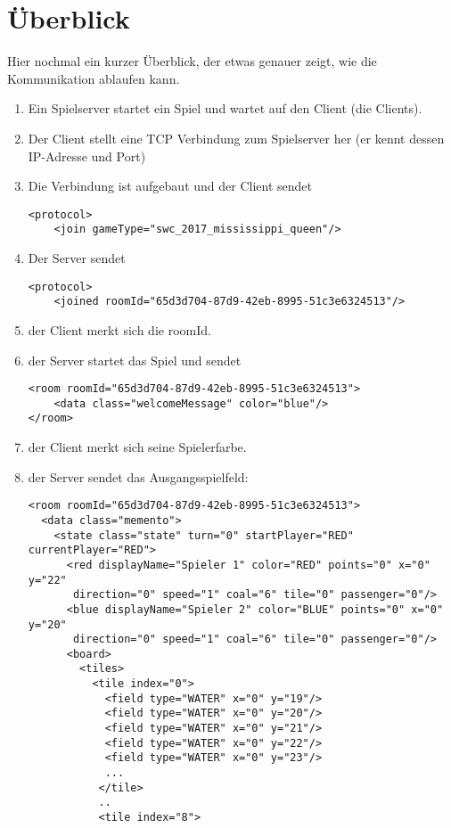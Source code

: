 \documentclass[12pt,a4paper, ngerman, oneside]{scrartcl}
\begin{document}
\newpage
\part{Überblick}
Hier nochmal ein kurzer Überblick, der etwas genauer zeigt, wie die
Kommunikation ablaufen kann.\bigskip\\

\begin{enumerate}
\item Ein Spielserver startet ein Spiel und wartet auf den Client (die Clients).
\item Der Client stellt eine TCP Verbindung zum Spielserver her (er kennt dessen IP-Adresse und Port)
\item Die Verbindung ist aufgebaut und der Client sendet \begin{verbatim}
<protocol>
    <join gameType="swc_2017_mississippi_queen"/>
\end{verbatim}
\item Der Server sendet \begin{verbatim}
<protocol>
    <joined roomId="65d3d704-87d9-42eb-8995-51c3e6324513"/>
\end{verbatim}
\item der Client merkt sich die roomId.
\item der Server startet das Spiel und sendet \begin{verbatim}
<room roomId="65d3d704-87d9-42eb-8995-51c3e6324513">
    <data class="welcomeMessage" color="blue"/>
</room>
\end{verbatim}
\item der Client merkt sich seine Spielerfarbe.
\item der Server sendet das Ausgangsspielfeld: 
\begin{verbatim}
<room roomId="65d3d704-87d9-42eb-8995-51c3e6324513">
  <data class="memento">
    <state class="state" turn="0" startPlayer="RED" currentPlayer="RED">
      <red displayName="Spieler 1" color="RED" points="0" x="0" y="22"
       direction="0" speed="1" coal="6" tile="0" passenger="0"/>
      <blue displayName="Spieler 2" color="BLUE" points="0" x="0" y="20"
       direction="0" speed="1" coal="6" tile="0" passenger="0"/>
      <board>
        <tiles>
          <tile index="0">
            <field type="WATER" x="0" y="19"/>
            <field type="WATER" x="0" y="20"/>
            <field type="WATER" x="0" y="21"/>
            <field type="WATER" x="0" y="22"/>
            <field type="WATER" x="0" y="23"/>
            ...
           </tile>
           ..
           <tile index="8">

\end{verbatim}
\end{enumerate}
\end{document}
